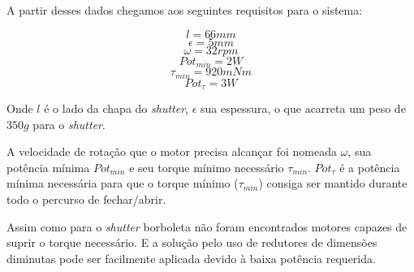 A partir desses dados chegamos aos seguintes requisitos para o sistema:

\[ l = 66 mm\]
\[ \epsilon = 5 mm\]
\[ \omega = 32 rpm\]
\[ {Pot}_{min} = 2 W \]
\[ \tau_{min} = 920 mNm \]
\[ Pot_{\tau} = 3 W \]


Onde $l$ é o lado da chapa do \textit{shutter}, $\epsilon$ sua espessura, o que
acarreta um peso de $350g$ para o \textit{shutter}.

A velocidade de rotação que o motor precisa alcançar foi nomeada $\omega$, sua
potência mínima $Pot_{min}$  e seu torque mínimo necessário $\tau_{min}$.
$Pot_{\tau}$ é a potência mínima necessária para que o torque mínimo
($\tau_{min}$) consiga ser mantido durante todo o percurso de fechar/abrir.

Assim como para o \textit{shutter} borboleta não foram encontrados motores
capazes de suprir o torque necessário. E a solução pelo uso de redutores de
dimensões diminutas pode ser facilmente aplicada devido à baixa potência
requerida.
